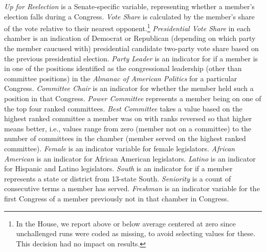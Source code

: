 \documentclass[12pt]{article}
\begin{document}
\textit{Up for Reelection} is a Senate-specific variable, representing whether a member's election falls during a Congress.
\textit{Vote Share} is calculated by the member's share of the vote relative to their nearest opponent.\footnote{\doublespacing\normalsize In the House, we report above or below average centered at zero since unchallenged runs were coded as missing, to avoid selecting values for these. This decision had no impact on results.}  \textit{Presidential Vote Share} in each chamber is an indication of Democrat or Republican (depending on which party the member caucused with) presidential candidate two-party vote share based on the previous presidential election.  \textit{Party Leader} is an indicator for if a member is in one of the positions identified as the congressional leadership (other than committee positions) in the \textit{Almanac of American Politics} for a particular Congress. \textit{Committee Chair} is an indicator for whether the member held such a position in that Congress.  \textit{Power Committee} represents a member being on one of the top four ranked committees.  \textit{Best Committee} takes a value based on the highest ranked committee a member was on with ranks reversed so that higher means better, i.e., values range from zero (member not on a committee) to the number of committees in the chamber (member served on the highest ranked committee).  \textit{Female} is an indicator variable for female legislators.  \textit{African American} is an indicator for African American legislators.  \textit{Latino} is an indicator for Hispanic and Latino legislators.  \textit{South} is an indicator for if a member represents a state or district from 13-state South.  \textit{Seniority} is a count of consecutive terms a member has served.  \textit{Freshman} is an indicator variable for the first Congress of a member previously not in that chamber in Congress.
\end{document}
